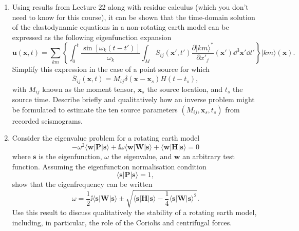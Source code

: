 \documentclass[a4paper,10pt]{paper}
\begin{document}
\begin{enumerate}
\item Using results from Lecture 22 along with residue calculus (which you don't need to know for this course), it can be shown that the time-domain solution of the elastodynamic equations in a non-rotating earth model can be expressed as the following eigenfunction expansion
\begin{equation*}
    \mathbf{u}(\mathbf{x},t)=\sum_{km}\left\{\int_{0}^{t}\frac{\sin[\omega_{k}(t-t')]}{\omega_{k}}\int_{M}\overline{S}_{ij}(\mathbf{x}',t')\frac{\partial|km\rangle^{*}}{\partial x'_{j}}(\mathbf{x}')\dd^{3}\mathbf{x}'\dd t'\right\}|km\rangle(\mathbf{x}).
\end{equation*}
Simplify this expression in the case of a point source for which
\begin{equation*}
    \overline{S}_{ij}(\mathbf{x},t)=M_{ij}\delta(\mathbf{x}-\mathbf{x}_{s})H(t-t_{s}),
\end{equation*}
with $M_{ij}$ known as the moment tensor, $\mathbf{x}_{s}$ the source location, and $t_{s}$ the source time. Describe briefly and qualitatively how an inverse problem might be formulated to estimate the ten source parameters $(M_{ij},\mathbf{x}_{s},t_{s})$ from recorded seismograms.

\item Consider the eigenvalue problem for a rotating earth model
\begin{equation*}
    -\omega^{2}\langle \mathbf{w}|\mathbf{P}|\mathbf{s}\rangle+\ii\omega\langle \mathbf{w}|\mathbf{W}|\mathbf{s}\rangle+\langle \mathbf{w}|\mathbf{H}|\mathbf{s}\rangle=0
\end{equation*}
where $\mathbf{s}$ is the eigenfunction, $\omega$ the eigenvalue, and $\mathbf{w}$ an arbitrary test function. Assuming the eigenfunction normalisation condition
\begin{equation*}
    \langle \mathbf{s}|\mathbf{P}|\mathbf{s}\rangle=1,
\end{equation*}
show that the eigenfrequency can be written
\begin{equation*}
    \omega=\frac{1}{2}\ii\langle \mathbf{s}|\mathbf{W}|\mathbf{s}\rangle\pm\sqrt{\langle \mathbf{s}|\mathbf{H}|\mathbf{s}\rangle-\frac{1}{4}\langle \mathbf{s}|\mathbf{W}|\mathbf{s}\rangle^{2}}.
\end{equation*}
Use this result to discuss qualitatively the stability of a rotating earth model, including, in particular, the role of the Coriolis and centrifugal forces.

\end{enumerate}
\end{document}
